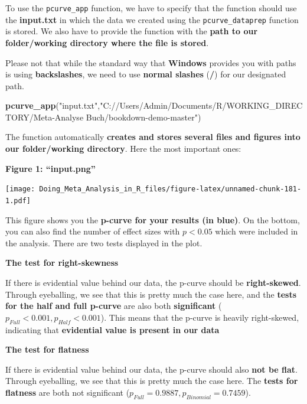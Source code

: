 \documentclass[]{book}
\newenvironment{Shaded}{\begin{snugshade}}{\end{snugshade}}
\newcommand{\KeywordTok}[1]{\textcolor[rgb]{0.13,0.29,0.53}{\textbf{#1}}}
\newcommand{\NormalTok}[1]{#1}
\newcommand{\StringTok}[1]{\textcolor[rgb]{0.31,0.60,0.02}{#1}}
\begin{document}
To use the \texttt{pcurve\_app} function, we have to specify that the function should use the \textbf{input.txt} in which the data we created using the \texttt{pcurve\_dataprep} function is stored. We also have to provide the function with the \textbf{path to our folder/working directory where the file is stored}.

\begin{rmdachtung}
Please not that while the standard way that \textbf{Windows} provides
you with paths is using \textbf{backslashes}, we need to use
\textbf{normal slashes} (\textbf{/}) for our designated path.
\end{rmdachtung}

\begin{Shaded}
\begin{Highlighting}[]
\KeywordTok{pcurve_app}\NormalTok{(}\StringTok{"input.txt"}\NormalTok{,}\StringTok{"C://Users/Admin/Documents/R/WORKING_DIRECTORY/Meta-Analyse Buch/bookdown-demo-master"}\NormalTok{)}
\end{Highlighting}
\end{Shaded}

The function automatically \textbf{creates and stores several files and figures into our folder/working directory}. Here the most important ones:

\textbf{Figure 1: ``input.png''}

\texttt{[image: Doing\_Meta\_Analysis\_in\_R\_files/figure-latex/unnamed-chunk-181-1.pdf]}

This figure shows you the \textbf{p-curve for your results (in blue)}. On the bottom, you can also find the number of effect sizes with \(p<0.05\) which were included in the analysis. There are two tests displayed in the plot.

\textbf{The test for right-skewness}

If there is evidential value behind our data, the p-curve should be \textbf{right-skewed}. Through eyeballing, we see that this is pretty much the case here, and the \textbf{tests for the half and full p-curve} are also both \textbf{significant} (\(p_{Full}<0.001, p_{Half}<0.001\)). This means that the p-curve is heavily right-skewed, indicating that \textbf{evidential value is present in our data}

\textbf{The test for flatness}

If there is evidential value behind our data, the p-curve should also \textbf{not be flat}. Through eyeballing, we see that this is pretty much the case here. The \textbf{tests for flatness} are both not significant (\(p_{Full}=0.9887, p_{Binomial}=0.7459\)).
\end{document}
